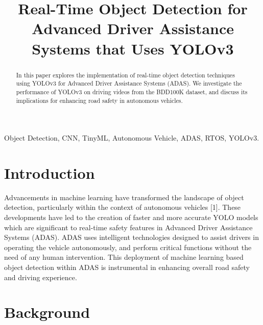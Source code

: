 \documentclass[conference]{IEEEtran}
\begin{document}
\title{Real-Time Object Detection for Advanced Driver Assistance Systems that Uses YOLOv3}

\author{
}

\maketitle

\begin{abstract}
In this paper explores the implementation of real-time object detection techniques using YOLOv3 for Advanced Driver Assistance
Systems (ADAS). We investigate the performance of YOLOv3 on driving videos from the BDD100K dataset, and discuss its implications 
for enhancing road safety in autonomous vehicles.
\end{abstract}

\begin{IEEEkeywords}
Object Detection, CNN, TinyML, Autonomous Vehicle, ADAS, RTOS, YOLOv3.
\end{IEEEkeywords}

\section{Introduction}
Advancements in machine learning have transformed the landscape of object detection, particularly 
within the context of autonomous vehicles [1]. These developments have led to the creation of faster and 
more accurate YOLO models which are significant to real-time safety features in Advanced Driver Assistance 
Systems (ADAS). ADAS uses intelligent technologies designed to assist drivers in operating the vehicle 
autonomously, and perform critical functions without the need of any human intervention. This deployment  
of machine learning based object detection within ADAS is instrumental in enhancing overall road safety 
and driving experience.

\section{Background}
\end{document}
